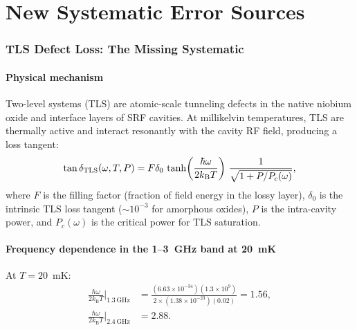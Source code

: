 \documentclass[11pt]{article}
\newcommand{\ee}[1]{\times 10^{#1}}
\newcommand{\kB}{k_{\mathrm{B}}}
\theoremstyle{definition}
\theoremstyle{remark}
\begin{document}
\part{New Systematic Error Sources}
\label{part:systematics}


\section{TLS Defect Loss: The Missing Systematic}
\label{sec:tls}

\subsection{Physical mechanism}

Two-level systems (TLS) are atomic-scale tunneling defects in the native
niobium oxide and interface layers of SRF cavities. At millikelvin temperatures,
TLS are thermally active and interact resonantly with the cavity RF field,
producing a loss tangent:
\begin{equation}
\tan\delta_{\rm TLS}(\omega, T, P) = F\delta_0\,
\tanh\!\left(\frac{\hbar\omega}{2\kB T}\right)
\,\frac{1}{\sqrt{1 + P/P_c(\omega)}},
\label{eq:tls_loss}
\end{equation}
where $F$ is the filling factor (fraction of field energy in the lossy
layer), $\delta_0$ is the intrinsic TLS loss tangent ($\sim 10^{-3}$
for amorphous oxides), $P$ is the intra-cavity power, and
$P_c(\omega)$ is the critical power for TLS saturation.

\subsection{Frequency dependence in the 1--3~GHz band at 20~mK}

At $T = 20$~mK:
\begin{align}
\frac{\hbar\omega}{2\kB T}\bigg|_{1.3\,\text{GHz}} &=
\frac{(6.63\ee{-34})(1.3\ee{9})}{2\times(1.38\ee{-23})(0.02)}
= 1.56, \\
\frac{\hbar\omega}{2\kB T}\bigg|_{2.4\,\text{GHz}} &= 2.88.
\end{align}
\end{document}
